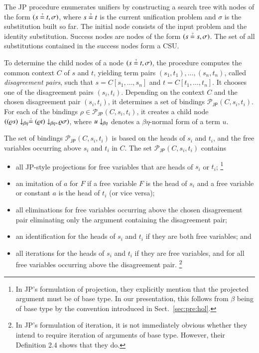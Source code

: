 %
%
The JP procedure enumerates unifiers by constructing a search tree with nodes of the form $(s \unif t, \sigma)$, where $s \unif t$ is the current unification
problem and $\sigma$ is the substitution built so far. 
The initial node consists of the input problem and the
identity substitution. Success nodes are nodes of the form $(s \unif s, \sigma)$.
The set of all substitutions contained in the success nodes form a CSU.

To determine the
child nodes of a node $(s \unif t, \sigma)$, the procedure  computes the common context $C$ of $s$ and $t$,
yielding term pairs $(s_1, t_1), \ldots, (s_n, t_n)$, called \emph{disagreement
pairs}, such that $s = C[s_1,\ldots,s_n]$ and $t = C[t_1,\ldots,t_n]$. It
chooses one of the disagreement pairs $(s_i, t_i)$.
Depending on the context $C$ and the chosen disagreement pair $(s_i, t_i)$,
it determines a set of bindings $\mathcal{P}_\mathsf{JP}(C,s_i, t_i)$.
For each of the bindings $\rho\in\mathcal{P}_\mathsf{JP}(C,s_i, t_i)$, it creates a child node
$(\nf{(\varrho{s})}{\beta\eta} \unif \nf{(\varrho{t})}{\beta\eta}, \varrho\sigma)$,
where $\nf{u}{\beta\eta}$ denotes a
$\beta\eta$-normal form of a term $u$. 

The set of bindings $\mathcal{P}_\mathsf{JP}(C,s_i, t_i)$
is based on the heads of $s_i$ and $t_i$, and the free variables occurring above
$s_i$ and $t_i$ in $C$. The set $\mathcal{P}_\mathsf{JP}(C,s_i, t_i)$ contains
\begin{itemize}
  \item all JP-style projections for free variables that are heads of $s_i$ or $t_i$;%
\footnote{In JP's formulation of projection, they explicitly mention that the projected argument must be of base type. 
In our presentation, this follows from $\beta$ being of base type by the convention introduced in Sect.~\ref{sec:pre:hol}.}
  
  \item an imitation of $a$ for $F$ if a free variable $F$ is the head of $s_i$ and a free
  variable or constant $a$ is the head of $t_i$ (or vice versa);
  \item all eliminations for free variables occurring above the
  chosen disagreement pair
  eliminating only the argument containing the disagreement pair;
  \item an identification for the heads of $s_i$ and $t_i$ if they are both free variables; and
  \item all iterations for the heads of $s_i$ and
  $t_i$ if they are free variables, and for all free variables occurring above the disagreement pair.%
\footnote{In JP's formulation of iteration, it is not immediately obvious whether they intend to require iteration of arguments of base type.
However, their Definition 2.4 \cite{jp-76-unif} shows that they do.}
\end{itemize}

